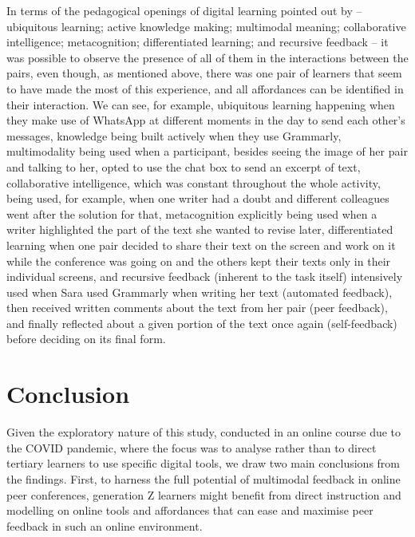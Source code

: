 \documentclass[english]{textolivre}
\begin{document}
In terms of the pedagogical openings of digital learning pointed out by \textcite{cope2013towards, cope2017learning} – ubiquitous learning; active knowledge making; multimodal meaning; collaborative intelligence; metacognition; differentiated learning; and recursive feedback – it was possible to observe the presence of all of them in the interactions between the pairs, even though, as mentioned above, there was one pair of learners that seem to have made the most of this experience, and all affordances can be identified in their interaction. We can see, for example, ubiquitous learning happening when they make use of WhatsApp at different moments in the day to send each other's messages, knowledge being built actively when they use Grammarly, multimodality being used when a participant, besides seeing the image of her pair and talking to her, opted to use the chat box to send an excerpt of text, collaborative intelligence, which was constant throughout the whole activity, being used, for example, when one writer had a doubt and different colleagues went after the solution for that, metacognition explicitly being used when a writer highlighted the part of the text she wanted to revise later, differentiated learning when one pair decided to share their text on the screen and work on it while the conference was going on and the others kept their texts only in their individual screens, and recursive feedback (inherent to the task itself) intensively used when Sara used Grammarly when writing her text (automated feedback), then received written comments about the text from her pair (peer feedback), and finally reflected about a given portion of the text once again (self-feedback) before deciding on its final form.

\section{Conclusion}

Given the exploratory nature of this study, conducted in an online course due to the COVID pandemic, where the focus was to analyse rather than to direct tertiary learners to use specific digital tools, we draw two main conclusions from the findings. First, to harness the full potential of multimodal feedback in online peer conferences, generation Z learners might benefit from direct instruction and modelling on online tools and affordances \cite{cheung2022verbal, elola2017writing, yang2021feedback} that can ease and maximise peer feedback in such an online environment.
\end{document}
